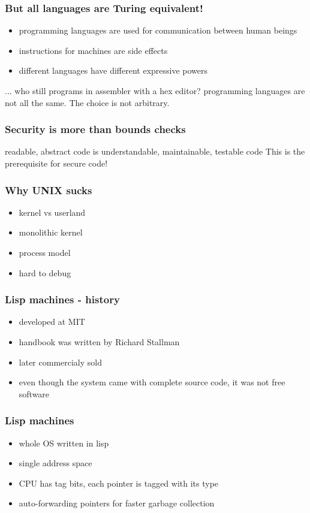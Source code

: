 \documentclass[compress]{beamer}
\begin{document}
\begin{frame}
  \frametitle{But all languages are Turing equivalent!}
  \begin{itemize}
  \item programming languages are used for communication between human beings
  \item instructions for machines are side effects
  \item different languages have different expressive powers
  \end{itemize}
  ... who still programs in assembler with a hex editor? programming languages are not all the same. The choice is not arbitrary.
\end{frame}

\begin{frame}
  \frametitle{Security is more than bounds checks}
  readable, abstract code is understandable, maintainable, testable code
  This is the prerequisite for secure code!
\end{frame}

\begin{frame}
  \frametitle{Why UNIX sucks}
  \begin{itemize}
  \item kernel vs userland
  \item monolithic kernel
  \item process model
  \item hard to debug
  \end{itemize}
\end{frame}

\begin{frame}
  \frametitle{Lisp machines - history}
  \begin{itemize}
  \item developed at MIT
  \item handbook was written by Richard Stallman
  \item later commercialy sold
  \item even though the system came with complete source code, it was not free software
  \end{itemize}
\end{frame}

\begin{frame}
  \frametitle{Lisp machines}
  \begin{itemize}
  \item whole OS written in lisp
  \item single address space
  \item CPU has tag bits, each pointer is tagged with its type
  \item auto-forwarding pointers for faster garbage collection
  \end{itemize}
\end{frame}
\end{document}
